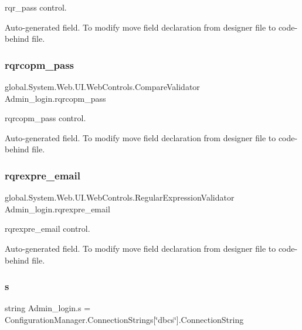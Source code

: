 rqr\+\_\+pass control. 

Auto-\/generated field. To modify move field declaration from designer file to code-\/behind file. \mbox{\label{class_admin__login_a417f96c2085915593a4a041488afabfb}} 
\subsubsection{\texorpdfstring{rqrcopm\_pass}{rqrcopm\_pass}}
{\footnotesize\ttfamily global.\+System.\+Web.\+U\+I.\+Web\+Controls.\+Compare\+Validator Admin\+\_\+login.\+rqrcopm\+\_\+pass\hspace{0.3cm}{\ttfamily [protected]}}



rqrcopm\+\_\+pass control. 

Auto-\/generated field. To modify move field declaration from designer file to code-\/behind file. \mbox{\label{class_admin__login_ab77100417d1dcefbb924447194a04380}} 
\subsubsection{\texorpdfstring{rqrexpre\_email}{rqrexpre\_email}}
{\footnotesize\ttfamily global.\+System.\+Web.\+U\+I.\+Web\+Controls.\+Regular\+Expression\+Validator Admin\+\_\+login.\+rqrexpre\+\_\+email\hspace{0.3cm}{\ttfamily [protected]}}



rqrexpre\+\_\+email control. 

Auto-\/generated field. To modify move field declaration from designer file to code-\/behind file. \mbox{\label{class_admin__login_a88c4984bf54e0aeaa4a27e3f24540da0}} 
\subsubsection{\texorpdfstring{s}{s}}
{\footnotesize\ttfamily string Admin\+\_\+login.\+s = Configuration\+Manager.\+Connection\+Strings\mbox{[}\char`\"{}dbcs\char`\"{}\mbox{]}.Connection\+String\hspace{0.3cm}{\ttfamily [private]}}

